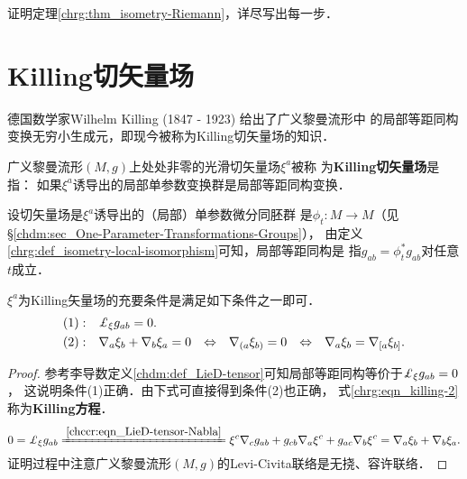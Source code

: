 \begin{exercise}
	证明定理\ref{chrg:thm_isometry-Riemann}，详尽写出每一步．
\end{exercise}



\section{Killing切矢量场}\label{chrg:sec_killing}
德国数学家Wilhelm Killing (1847 - 1923) 给出了广义黎曼流形中
的局部等距同构变换无穷小生成元，即现今被称为{Killing切矢量场}的知识．

\begin{definition}\label{chrg:def_killing}
    广义黎曼流形$(M,g)$上处处非零的光滑切矢量场$\xi^a$被称
    为{\bfseries \heiti Killing切矢量场}是指：
    如果$\xi^a$诱导出的局部单参数变换群是局部等距同构变换．
\end{definition}
设切矢量场是$\xi^a$诱导出的（局部）单参数微分同胚群
是$\phi_{t}:M\to M$（见\S\ref{chdm:sec_One-Parameter-Transformations-Groups}），
由定义\ref{chrg:def_isometry-local-isomorphism}可知，局部等距同构是
指$g_{ab}=\phi_t^{*}g_{ab}$对任意$t$成立．

\begin{theorem}\label{chrg:thm_killing}
    $\xi^a$为Killing矢量场的充要条件是满足如下条件之一即可．
    \begin{align}
        { (1)}:&\quad \Lie_{\xi} g_{ab} =0. \label{chrg:eqn_killing-1} \\
        { (2)}:&\quad \nabla_a \xi_b + \nabla_b \xi_a =0   {\quad \Leftrightarrow \quad}
        \nabla_{(a}\xi_{b)} =0   {\quad \Leftrightarrow \quad}
        \nabla_{a}\xi_{b} =\nabla_{[a}\xi_{b]}. \label{chrg:eqn_killing-2} %
    \end{align}
\end{theorem}
\begin{proof}
    参考李导数定义\eqref{chdm:def_LieD-tensor}可知局部等距同构等价于$\Lie_{\xi} g_{ab} =0$，
    这说明条件(1)正确．由下式可直接得到条件(2)也正确，
    式\eqref{chrg:eqn_killing-2}称为{\bfseries \heiti Killing方程}．
    \begin{equation*}
        0=\Lie_{\xi} g_{ab}\xlongequal{\ref{chccr:eqn_LieD-tensor-Nabla}} \xi^c \nabla_c g_{ab}+
         g_{cb} \nabla_a \xi^c + g_{ac} \nabla_b \xi^c = \nabla_a \xi_b + \nabla_b \xi_a .
    \end{equation*}
    证明过程中注意广义黎曼流形$(M,g)$的Levi-Civita联络是无挠、容许联络．
\end{proof}

